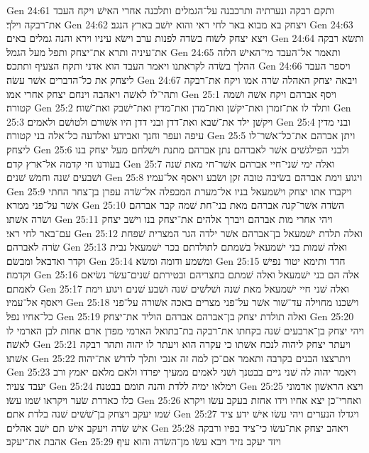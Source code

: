 Gen 24:61  ותקם רבקה ונערתיה ותרכבנה על־הגמלים ותלכנה אחרי האישׁ ויקח העבד את־רבקה וילך׃
Gen 24:62  ויצחק בא מבוא באר לחי ראי והוא יושׁב בארץ הנגב׃
Gen 24:63  ויצא יצחק לשׂוח בשׂדה לפנות ערב וישׂא עיניו וירא והנה גמלים באים׃
Gen 24:64  ותשׂא רבקה את־עיניה ותרא את־יצחק ותפל מעל הגמל׃
Gen 24:65  ותאמר אל־העבד מי־האישׁ הלזה ההלך בשׂדה לקראתנו ויאמר העבד הוא אדני ותקח הצעיף ותתכס׃
Gen 24:66  ויספר העבד ליצחק את כל־הדברים אשׁר עשׂה׃
Gen 24:67  ויבאה יצחק האהלה שׂרה אמו ויקח את־רבקה ותהי־לו לאשׁה ויאהבה וינחם יצחק אחרי אמו׃
Gen 25:1  ויסף אברהם ויקח אשׁה ושׁמה קטורה׃
Gen 25:2  ותלד לו את־זמרן ואת־יקשׁן ואת־מדן ואת־מדין ואת־ישׁבק ואת־שׁוח׃
Gen 25:3  ויקשׁן ילד את־שׁבא ואת־דדן ובני דדן היו אשׁורם ולטושׁם ולאמים׃
Gen 25:4  ובני מדין עיפה ועפר וחנך ואבידע ואלדעה כל־אלה בני קטורה׃
Gen 25:5  ויתן אברהם את־כל־אשׁר־לו ליצחק׃
Gen 25:6  ולבני הפילגשׁים אשׁר לאברהם נתן אברהם מתנת וישׁלחם מעל יצחק בנו בעודנו חי קדמה אל־ארץ קדם׃
Gen 25:7  ואלה ימי שׁני־חיי אברהם אשׁר־חי מאת שׁנה ושׁבעים שׁנה וחמשׁ שׁנים׃
Gen 25:8  ויגוע וימת אברהם בשׂיבה טובה זקן ושׂבע ויאסף אל־עמיו׃
Gen 25:9  ויקברו אתו יצחק וישׁמעאל בניו אל־מערת המכפלה אל־שׂדה עפרן בן־צחר החתי אשׁר על־פני ממרא׃
Gen 25:10  השׂדה אשׁר־קנה אברהם מאת בני־חת שׁמה קבר אברהם ושׂרה אשׁתו׃
Gen 25:11  ויהי אחרי מות אברהם ויברך אלהים את־יצחק בנו וישׁב יצחק עם־באר לחי ראי׃
Gen 25:12  ואלה תלדת ישׁמעאל בן־אברהם אשׁר ילדה הגר המצרית שׁפחת שׂרה לאברהם׃
Gen 25:13  ואלה שׁמות בני ישׁמעאל בשׁמתם לתולדתם בכר ישׁמעאל נבית וקדר ואדבאל ומבשׂם׃
Gen 25:14  ומשׁמע ודומה ומשׂא׃
Gen 25:15  חדד ותימא יטור נפישׁ וקדמה׃
Gen 25:16  אלה הם בני ישׁמעאל ואלה שׁמתם בחצריהם ובטירתם שׁנים־עשׂר נשׂיאם לאמתם׃
Gen 25:17  ואלה שׁני חיי ישׁמעאל מאת שׁנה ושׁלשׁים שׁנה ושׁבע שׁנים ויגוע וימת ויאסף אל־עמיו׃
Gen 25:18  וישׁכנו מחוילה עד־שׁור אשׁר על־פני מצרים באכה אשׁורה על־פני כל־אחיו נפל׃
Gen 25:19  ואלה תולדת יצחק בן־אברהם אברהם הוליד את־יצחק׃
Gen 25:20  ויהי יצחק בן־ארבעים שׁנה בקחתו את־רבקה בת־בתואל הארמי מפדן ארם אחות לבן הארמי לו לאשׁה׃
Gen 25:21  ויעתר יצחק ליהוה לנכח אשׁתו כי עקרה הוא ויעתר לו יהוה ותהר רבקה אשׁתו׃
Gen 25:22  ויתרצצו הבנים בקרבה ותאמר אם־כן למה זה אנכי ותלך לדרשׁ את־יהוה׃
Gen 25:23  ויאמר יהוה לה שׁני גיים בבטנך ושׁני לאמים ממעיך יפרדו ולאם מלאם יאמץ ורב יעבד צעיר׃
Gen 25:24  וימלאו ימיה ללדת והנה תומם בבטנה׃
Gen 25:25  ויצא הראשׁון אדמוני כלו כאדרת שׂער ויקראו שׁמו עשׂו׃
Gen 25:26  ואחרי־כן יצא אחיו וידו אחזת בעקב עשׂו ויקרא שׁמו יעקב ויצחק בן־שׁשׁים שׁנה בלדת אתם׃
Gen 25:27  ויגדלו הנערים ויהי עשׂו אישׁ ידע ציד אישׁ שׂדה ויעקב אישׁ תם ישׁב אהלים׃
Gen 25:28  ויאהב יצחק את־עשׂו כי־ציד בפיו ורבקה אהבת את־יעקב׃
Gen 25:29  ויזד יעקב נזיד ויבא עשׂו מן־השׂדה והוא עיף׃
